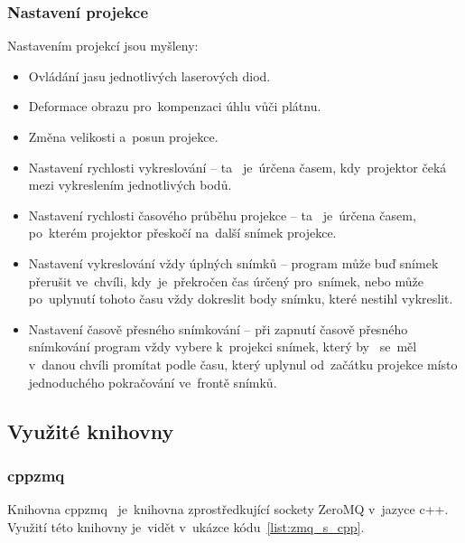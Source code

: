 \subsubsection{Nastavení projekce}
Nastavením projekcí jsou myšleny:
\begin{itemize}
\item Ovládání jasu jednotlivých laserových diod.
\item Deformace obrazu pro~kompenzaci úhlu vůči plátnu.
\item Změna velikosti a~posun projekce. 
\item Nastavení rychlosti vykreslování -- ta ~je~úrčena časem, kdy~projektor čeká mezi vykreslením jednotlivých bodů.
\item Nastavení rychlosti časového průběhu projekce -- ta ~je~úrčena časem, po~kterém projektor přeskočí na~další snímek projekce.
\item Nastavení vykreslování vždy úplných snímků -- program může buď snímek přerušit ve~chvíli, kdy~je~překročen čas úrčený pro~snímek, nebo může po~uplynutí tohoto času vždy dokreslit body snímku, které nestihl vykreslit.
\item Nastavení časově přesného snímkování -- při zapnutí časově přesného snímkování program vždy vybere k~projekci snímek, který by ~se~měl v~danou chvíli promítat podle času, který uplynul od~začátku projekce místo jednoduchého pokračování ve~frontě snímků.
\end{itemize}



\subsection{Využité knihovny}
\subsubsection{cppzmq}\label{sec:ls_cppzmq}
Knihovna cppzmq~\cite{cppzmq} je~knihovna zprostředkující sockety ZeroMQ v~jazyce c++. Využití této knihovny je~vidět v~ukázce kódu~\ref{list:zmq_s_cpp}.
\begin{code}
  \inputminted[frame=lines,fontsize=\footnotesize{}, linenos, breaklines]{cpp}{code_examples/zmq_server.cpp}
\end{code}

